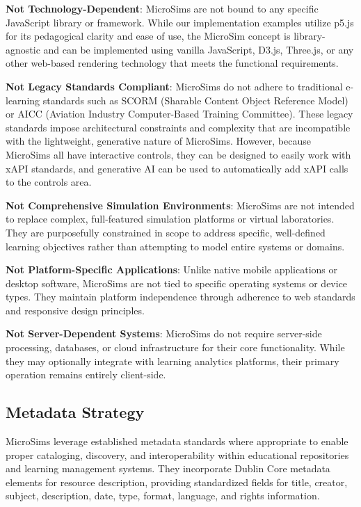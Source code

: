 \textbf{Not Technology-Dependent}: MicroSims are not bound to any specific JavaScript library or framework. While our implementation examples utilize p5.js for its pedagogical clarity and ease of use, the MicroSim concept is library-agnostic and can be implemented using vanilla JavaScript, D3.js, Three.js, or any other web-based rendering technology that meets the functional requirements.

\textbf{Not Legacy Standards Compliant}: MicroSims do not adhere to traditional e-learning standards such as SCORM (Sharable Content Object Reference Model) or AICC (Aviation Industry Computer-Based Training Committee). These legacy standards impose architectural constraints and complexity that are incompatible with the lightweight, generative nature of MicroSims. However, because MicroSims all have interactive controls, they can be designed to easily work with xAPI standards, and generative AI can be used to automatically add xAPI calls to the controls area.

\textbf{Not Comprehensive Simulation Environments}: MicroSims are not intended to replace complex, full-featured simulation platforms or virtual laboratories. They are purposefully constrained in scope to address specific, well-defined learning objectives rather than attempting to model entire systems or domains.

\textbf{Not Platform-Specific Applications}: Unlike native mobile applications or desktop software, MicroSims are not tied to specific operating systems or device types. They maintain platform independence through adherence to web standards and responsive design principles.

\textbf{Not Server-Dependent Systems}: MicroSims do not require server-side processing, databases, or cloud infrastructure for their core functionality. While they may optionally integrate with learning analytics platforms, their primary operation remains entirely client-side.

\subsection{Metadata Strategy}

MicroSims leverage established metadata standards where appropriate to enable proper cataloging, discovery, and interoperability within educational repositories and learning management systems. They incorporate Dublin Core metadata elements for resource description, providing standardized fields for title, creator, subject, description, date, type, format, language, and rights information.


